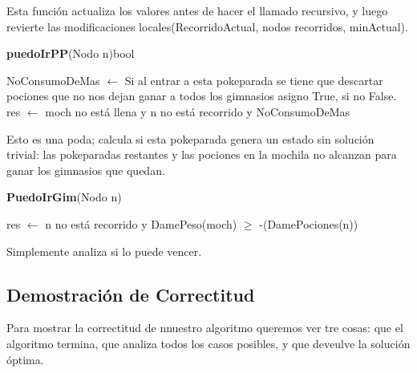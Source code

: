 \documentclass[spanish,12pt]{article}
\begin{document}
Esta función actualiza los valores antes de hacer el llamado recursivo, y luego revierte las modificaciones locales(RecorridoActual, nodos recorridos, minActual).


\begin{algorithm}[H]{\textbf{puedoIrPP}(Nodo n){bool}}
	\begin{algorithmic}[1]
	\State NoConsumoDeMas $\gets$ Si al entrar a esta pokeparada se tiene que descartar pociones que no nos dejan ganar a todos los gimnasios asigno True, si no False.
	\State  res $\gets$  moch no está llena y n no está recorrido y NoConsumoDeMas
	\end{algorithmic}
\end{algorithm}
Esto es una poda; calcula si esta pokeparada genera un estado sin solución trivial: las pokeparadas restantes y las pociones en la mochila no alcanzan para ganar los gimnasios que quedan.

\begin{algorithm}[H]{\textbf{PuedoIrGim}(Nodo n)}
	\begin{algorithmic}[1]
		\state res $\gets$  n no está recorrido y DamePeso(moch) $\geq$ -(DamePociones(n))
	\end{algorithmic}
\end{algorithm}

Simplemente analiza si lo puede vencer.

\subsection{Demostración de Correctitud}

Para mostrar la correctitud de nnuestro algoritmo queremos ver tre cosas: que el algoritmo termina, que analiza todos los casos posibles, y que deveulve la solución óptima.
\end{document}
